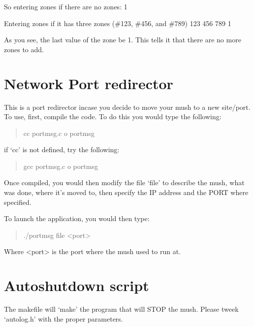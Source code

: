 \documentclass[letterpaper,10pt,english]{sphinxmanual}
\begin{document}
\sphinxAtStartPar
So entering zones if there are no zones:
\sphinxhyphen{}1

\sphinxAtStartPar
Entering zones if it has three zones (\#123, \#456, and \#789)
123
456
789
\sphinxhyphen{}1

\sphinxAtStartPar
As you see, the last value of the zone  be \sphinxhyphen{}1.  This tells it
that there are no more zones to add.


\chapter{Network Port redirector}
\label{\detokenize{39-portdirector:network-port-redirector}}\label{\detokenize{39-portdirector::doc}}
\sphinxAtStartPar
This is a port redirector incase you decide to move your mush
to a new site/port.  To use, first, compile the code.  To do
this you would type the following:
\begin{quote}

\sphinxAtStartPar
cc portmsg.c \sphinxhyphen{}o portmsg
\end{quote}

\sphinxAtStartPar
if ‘cc’ is not defined, try the following:
\begin{quote}

\sphinxAtStartPar
gcc portmsg.c \sphinxhyphen{}o portmsg
\end{quote}

\sphinxAtStartPar
Once compiled, you would then modify the file ‘file’ to describe
the mush, what was done, where it’s moved to, then specify the
IP address and the PORT where specified.

\sphinxAtStartPar
To launch the application, you would then type:
\begin{quote}

\sphinxAtStartPar
./portmsg file \textless{}port\textgreater{}
\end{quote}

\sphinxAtStartPar
Where \textless{}port\textgreater{} is the port where the mush used to run at.


\chapter{Autoshutdown script}
\label{\detokenize{40-autoshutdown:autoshutdown-script}}\label{\detokenize{40-autoshutdown::doc}}
\sphinxAtStartPar
The makefile will ‘make’ the program that will STOP the mush.
Please tweek ‘autolog.h’ with the proper parameters.
\end{document}
